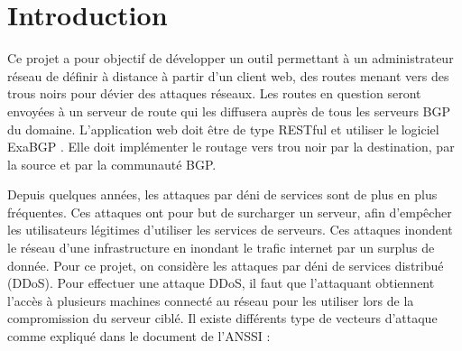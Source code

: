 \chapter*{Introduction}

Ce projet a pour objectif de développer un outil permettant à un administrateur réseau de définir à distance à partir d'un client web, des routes menant vers des trous noirs pour dévier des attaques réseaux. Les routes en question seront envoyées à un serveur de route qui les diffusera auprès de tous les serveurs BGP du domaine. L'application web doit être de type RESTful et utiliser le logiciel ExaBGP \cite{Exa13}. Elle doit implémenter le routage vers trou noir par la destination, par la source et par la communauté BGP.

Depuis quelques années, les attaques par déni de services sont de plus en plus fréquentes. Ces attaques ont pour but de surcharger un serveur, afin d'empêcher les utilisateurs légitimes d'utiliser les services de serveurs. Ces attaques inondent le réseau d'une infrastructure en inondant le trafic internet par un surplus de donnée. Pour ce projet, on considère les attaques par déni de services distribué (DDoS). Pour effectuer une attaque DDoS, il faut que l'attaquant obtiennent l'accès à plusieurs machines connecté au réseau pour les utiliser lors de la compromission du serveur ciblé. Il existe différents type de vecteurs d'attaque comme expliqué dans le document de l'ANSSI \cite{Ans15} :


